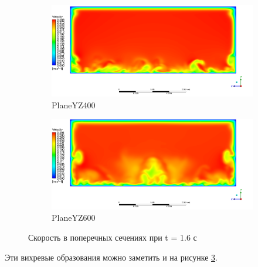 	\begin{figure}[H]
		\begin{subfigure}{.5\textwidth}
			\centering
			\includegraphics[width=1.1\linewidth]{../Assets/T16_Velocity_ContourYZ400}
			\caption{PlaneYZ400}
			\label{fig:T16VelocityContourYZ340}
		\end{subfigure}%
		\begin{subfigure}{.5\textwidth}
			\centering
			\includegraphics[width=1.1\linewidth]{../Assets/T16_Velocity_ContourYZ600}
			\caption{PlaneYZ600}
			\label{fig:T16VelocityContourYZ400}
		\end{subfigure}
		\caption{Скорость в поперечных сечениях при t = 1.6 с}
		\label{fig:T16VelocityContourYZ}
	\end{figure}
	Эти вихревые образования можно заметить и на рисунке \ref{fig:T16VelocityContourYZ}. 
	
